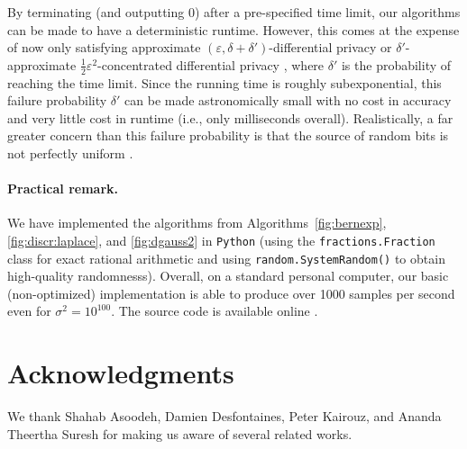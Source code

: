 \documentclass{jpc}
\newcommand{\eps}{\varepsilon}
\begin{document}
By terminating (and outputting 0) after a pre-specified time limit, our algorithms can be made to have a deterministic runtime. However, this comes at the expense of now only satisfying approximate $(\eps,\delta+\delta')$-differential privacy or $\delta'$-approximate $\frac12\eps^2$-concentrated differential privacy \citep{BunS16}, where $\delta'$ is the probability of reaching the time limit. Since the running time is roughly subexponential, this failure probability $\delta'$ can be made astronomically small with no cost in accuracy and very little cost in runtime (i.e., only milliseconds overall). Realistically, a far greater concern than this failure probability is that the source of random bits is not perfectly uniform \citep{GarfinkelL20}.

\paragraph{Practical remark.}
We have implemented the algorithms from Algorithms~\ref{fig:bernexp}, \ref{fig:discr:laplace}, and \ref{fig:dgauss2} in \texttt{Python} (using the \texttt{fractions.Fraction} class for exact rational arithmetic and using \texttt{random.SystemRandom()} to obtain high-quality randomnesss). Overall, on a standard personal computer, our basic (non-optimized) implementation is able to produce over 1000 samples per second even for $\sigma^2=10^{100}$. The source code is available online \citep{DGaussGithub}. 

\section*{Acknowledgments}
We thank Shahab Asoodeh, Damien Desfontaines, Peter Kairouz, and Ananda Theertha Suresh for making us aware of several related works.





\appendix
\end{document}
